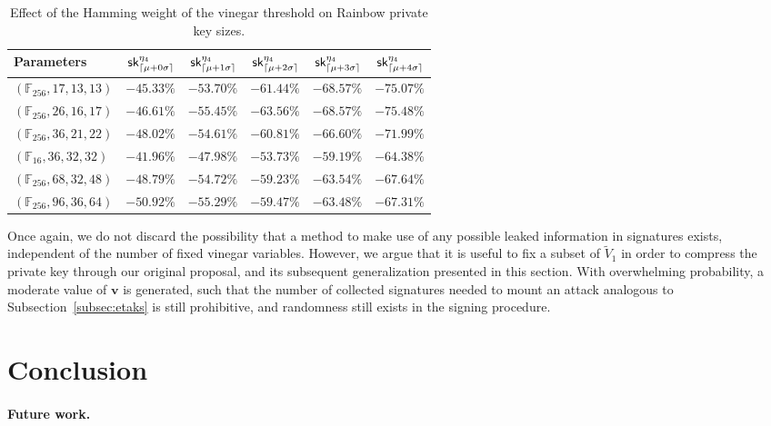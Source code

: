 \documentclass[12pt, a4paper, oneside]{memoir}
\DeclarePairedDelimiter{\ceil}{\lceil}{\rceil}
\theoremstyle{definition}
\begin{document}
\begin{table}[htbp]
  \renewcommand{\arraystretch}{1.2}
  \centering
  \caption{Effect of the Hamming weight of the vinegar threshold on Rainbow private key sizes.}\label{tab:key-size-std}
  \begin{tabular}{l*{5}{r}}
    \toprule
    Parameters & $\textsf{sk}^{\eta_{4}}_{\ceil{\mu + 0\sigma}}$ 
      & $\textsf{sk}^{\eta_{4}}_{\ceil{\mu + 1\sigma}}$ 
      & $\textsf{sk}^{\eta_{4}}_{\ceil{\mu + 2\sigma}}$ 
      & $\textsf{sk}^{\eta_{4}}_{\ceil{\mu + 3\sigma}}$ 
      & $\textsf{sk}^{\eta_{4}}_{\ceil{\mu + 4\sigma}}$ \\
    \midrule
    $(\mathbb{F}_{256}, 17, 13, 13)$ & $-45.33\%$ & $-53.70\%$ & $-61.44\%$ & $-68.57\%$ & $-75.07\%$ \\
    $(\mathbb{F}_{256}, 26, 16, 17)$ & $-46.61\%$ & $-55.45\%$ & $-63.56\%$ & $-68.57\%$ & $-75.48\%$ \\
    $(\mathbb{F}_{256}, 36, 21, 22)$ & $-48.02\%$ & $-54.61\%$ & $-60.81\%$ & $-66.60\%$ & $-71.99\%$ \\
    $(\mathbb{F}_{ 16}, 36, 32, 32)$ & $-41.96\%$ & $-47.98\%$ & $-53.73\%$ & $-59.19\%$ & $-64.38\%$ \\
    $(\mathbb{F}_{256}, 68, 32, 48)$ & $-48.79\%$ & $-54.72\%$ & $-59.23\%$ & $-63.54\%$ & $-67.64\%$ \\
    $(\mathbb{F}_{256}, 96, 36, 64)$ & $-50.92\%$ & $-55.29\%$ & $-59.47\%$ & $-63.48\%$ & $-67.31\%$ \\
    \bottomrule
  \end{tabular}
\end{table}

Once again, we do not discard the possibility that a method to make use of any possible leaked information in signatures exists, independent of the number of fixed vinegar variables. However, we argue that it is useful to fix a subset of $\widetilde{V}_{1}$ in order to compress the private key through our original proposal, and its subsequent generalization presented in this section. With overwhelming probability, a moderate value of $\mathbf{v}$ is generated, such that the number of collected signatures needed to mount an attack analogous to Subsection~\ref{subsec:etaks} is still prohibitive, and randomness still exists in the signing procedure.

\chapter{Conclusion}\label{ch:conc}

\subsubsection{Future work.}


{\scriptsize }
\end{document}
